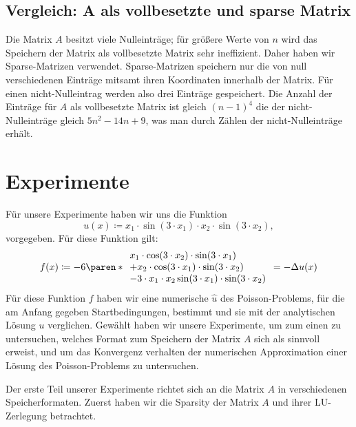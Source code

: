 \documentclass{scrartcl}
\begin{document}
\subsection{Vergleich: A als vollbesetzte und sparse Matrix}

Die Matrix \(A\) besitzt viele Nulleinträge; für größere Werte von \(n\) wird
das Speichern der Matrix als vollbesetzte Matrix sehr ineffizient. Daher haben
wir Sparse-Matrizen verwendet. Sparse-Matrizen speichern nur die von null
verschiedenen Einträge mitsamt ihren Koordinaten innerhalb der Matrix. Für
einen nicht-Nulleintrag werden also drei Einträge gespeichert. Die Anzahl der
Einträge für \(A\) als vollbesetzte Matrix ist gleich \({(n - 1)}^4\) die der
nicht-Nulleinträge gleich \(5n^2 - 14n + 9\), was man durch Zählen der
nicht-Nulleinträge erhält.

\section{Experimente}

Für unsere Experimente haben wir uns die Funktion
\begin{equation}\label{eq:u}
    u(x) \coloneq x_1 \cdot \sin(3 \cdot x_1) \cdot x_2 \cdot \sin(3 \cdot x_2),
\end{equation}
vorgegeben. Für diese Funktion gilt:
\begin{equation}\label{eq:f}
    f(x) \coloneq -6 \paren*{\begin{array}{l}
            x_1 \cdot \cos(3 \cdot x_2) \cdot \sin(3 \cdot x_1)   \\
            + x_2 \cdot \cos(3 \cdot x_1) \cdot \sin(3 \cdot x_2) \\
            - 3 \cdot x_1 \cdot x_2 \sin(3 \cdot x_1) \cdot \sin(3 \cdot x_2)
        \end{array}}
    = -\Delta u(x)
\end{equation}
Für diese Funktion \(f\) haben wir eine numerische \(\hat u\) des
Poisson-Problems, für die am Anfang gegeben Startbedingungen, bestimmt und
sie mit der analytischen Lösung \(u\) verglichen. Gewählt haben wir unsere
Experimente, um zum einen zu untersuchen, welches Format zum Speichern der
Matrix \(A\) sich als sinnvoll erweist, und um das Konvergenz verhalten der
numerischen Approximation einer Lösung des Poisson-Problems zu untersuchen.

Der erste Teil unserer Experimente richtet sich an die Matrix \(A\) in
verschiedenen Speicherformaten. Zuerst haben wir die Sparsity der Matrix \(A\)
und ihrer LU-Zerlegung betrachtet.
\end{document}
